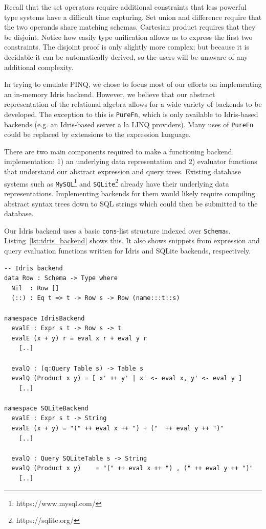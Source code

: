 \documentclass[12pt]{article}
\begin{document}
Recall that the set operators require additional constraints that less powerful type systems have a difficult time capturing.
Set union and difference require that the two operands share matching schemas.
Cartesian product requires that they be disjoint.
Notice how easily type unification allows us to express the first two constraints.
The disjoint proof is only slightly more complex; but because it is decidable it can be automatically derived, so the users will be unaware of any additional complexity.


In trying to emulate PINQ, we chose to focus most of our efforts on implementing an in-memory Idris backend.
However, we believe that our abstract representation of the relational algebra allows for a wide variety of backends to be developed.
The exception to this is \texttt{PureFn}, which is only available to Idris-based backends (e.g. an Idris-based server a la LINQ providers).
Many uses of \texttt{PureFn} could be replaced by extensions to the expression language.

There are two main components required to make a functioning backend implementation:
1) an underlying data representation and
2) evaluator functions that understand our abstract expression and query trees.
Existing database systems such as \texttt{MySQL}\footnote{https://www.mysql.com/} and \texttt{SQLite}\footnote{https://sqlite.org/} already have their underlying data representations.
Implementing backends for them would likely require compiling abstract syntax trees down to SQL strings which could then be submitted to the database.

Our Idris backend uses a basic \texttt{cons}-list structure indexed over \texttt{Schema}s.
Listing~\ref{lst:idris_backend} shows this.
It also shows snippets from expression and query evaluation functions written for Idris and SQLite backends, respectively.

\begin{lstlisting}[caption={Backend Implementation Snippets},label={lst:idris_backend}]
-- Idris backend
data Row : Schema -> Type where
  Nil  : Row []
  (::) : Eq t => t -> Row s -> Row (name:::t::s)

namespace IdrisBackend
  evalE : Expr s t -> Row s -> t
  evalE (x + y) r = eval x r + eval y r
    [..]

  evalQ : (q:Query Table s) -> Table s
  evalQ (Product x y) = [ x' ++ y' | x' <- eval x, y' <- eval y ]
    [..]

namespace SQLiteBackend
  evalE : Expr s t -> String
  evalE (x + y) = "(" ++ eval x ++ ") + ("  ++ eval y ++ ")"
    [..]

  evalQ : Query SQLiteTable s -> String
  evalQ (Product x y)    = "(" ++ eval x ++ ") , (" ++ eval y ++ ")"
    [..]
\end{lstlisting}
\end{document}
